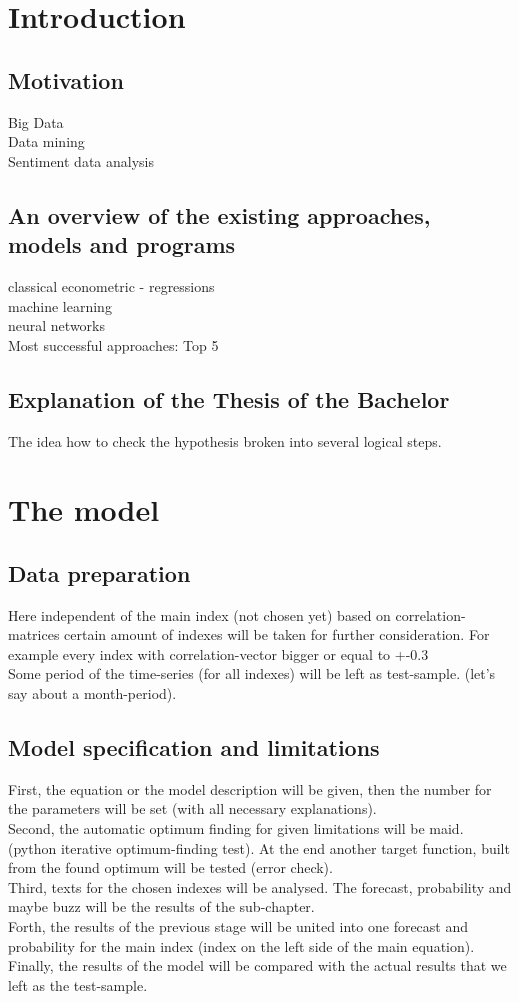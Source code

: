 \documentclass {article}
\begin{document}
\newpage
\section{Introduction}
\subsection{Motivation}
Big Data\\
Data mining\\
Sentiment data analysis
\subsection{An overview of the existing approaches, models and programs}
classical econometric - regressions\\
machine learning\\
neural networks\\
Most successful approaches: Top 5
\subsection{Explanation of the Thesis of the Bachelor}
The idea how to check the hypothesis broken into several logical steps.

\newpage
\section{The model}
\subsection{Data preparation}
Here independent of the main index (not chosen yet) based on correlation-matrices certain amount of indexes will be taken for further consideration. For example every index with correlation-vector bigger or equal to +-0.3\\
Some period of the time-series (for all indexes) will be left as test-sample. (let's say about a month-period).
\subsection{Model specification and limitations}
First, the equation or the model description will be given, then the number for the parameters will be set (with all necessary explanations).\\
Second, the automatic optimum finding for given limitations will be maid. (python iterative optimum-finding test). At the end another target function, built from the found optimum will be tested (error check).\\
Third, texts for the chosen indexes will be analysed. The forecast, probability and maybe buzz will be the results of the sub-chapter.\\
Forth, the results of the previous stage will be united into one forecast and probability for the main index (index on the left side of the main equation).\\
Finally, the results of the model will be compared with the actual results that we left as the test-sample.
\end{document}
